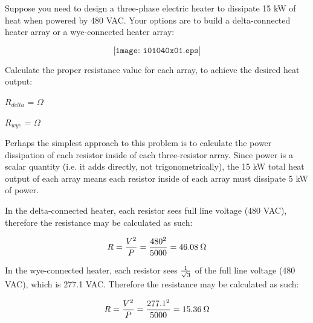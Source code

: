 

Suppose you need to design a three-phase electric heater to dissipate 15 kW of heat when powered by 480 VAC.  Your options are to build a delta-connected heater array or a wye-connected heater array:

$$\texttt{[image: i01040x01.eps]}$$

Calculate the proper resistance value for each array, to achieve the desired heat output:

\vskip 10pt

$R_{delta}$ = \underbar{\hskip 50pt} $\Omega$

\vskip 10pt

$R_{wye}$ = \underbar{\hskip 50pt} $\Omega$

\vskip 10pt







Perhaps the simplest approach to this problem is to calculate the power dissipation of each resistor inside of each three-resistor array.  Since power is a scalar quantity (i.e. it adds directly, not trigonometrically), the 15 kW total heat output of each array means each resistor inside of each array must dissipate 5 kW of power.
 
\vskip 10pt

In the delta-connected heater, each resistor sees full line voltage (480 VAC), therefore the resistance may be calculated as such:

$$R = {V^2 \over P} = {480^2 \over 5000} = 46.08 \> \Omega$$

In the wye-connected heater, each resistor sees $1 \over \sqrt{3}$ of the full line voltage (480 VAC), which is 277.1 VAC.  Therefore the resistance may be calculated as such:

$$R = {V^2 \over P} = {277.1^2 \over 5000} = 15.36 \> \Omega$$











